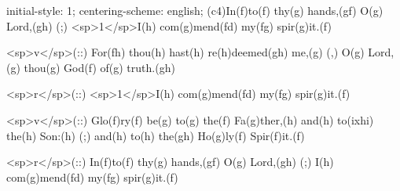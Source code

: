 initial-style: 1;
centering-scheme: english;
(c4)In(f)to(f) thy(g) hands,(gf) O(g) Lord,(gh) (;) <sp>1</sp>I(h) com(g)mend(fd) my(fg) spir(g)it.(f) 

<sp>v</sp>(::) For(fh) thou(h) hast(h) re(h)deemed(gh) me,(g) (,) O(g) Lord,(g) thou(g) God(f) of(g) truth.(gh) 

<sp>r</sp>(::) <sp>1</sp>I(h) com(g)mend(fd) my(fg) spir(g)it.(f) 

<sp>v</sp>(::) Glo(f)ry(f) be(g) to(g) the(f) Fa(g)ther,(h) and(h) to(ixhi) the(h) Son:(h) (;) and(h) to(h) the(gh) Ho(g)ly(f) Spir(f)it.(f)

<sp>r</sp>(::) In(f)to(f) thy(g) hands,(gf) O(g) Lord,(gh) (;) I(h) com(g)mend(fd) my(fg) spir(g)it.(f) 